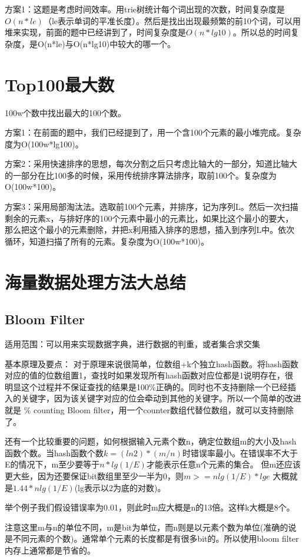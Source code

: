 方案1：这题是考虑时间效率。用trie树统计每个词出现的次数，时间复杂度是$O(n*le)$（le表示单词的平准长度）。然后是找出出现最频繁的前10个词，可以用堆来实现，前面的题中已经讲到了，时间复杂度是$O(n*lg10)$。所以总的时间复杂度，是O(n*le)与O(n*lg10)中较大的哪一个。

\section{Top100最大数}
100w个数中找出最大的100个数。

方案1：在前面的题中，我们已经提到了，用一个含100个元素的最小堆完成。复杂度为O(100w*lg100)。

方案2：采用快速排序的思想，每次分割之后只考虑比轴大的一部分，知道比轴大的一部分在比100多的时候，采用传统排序算法排序，取前100个。复杂度为O(100w*100)。

方案3：采用局部淘汰法。选取前100个元素，并排序，记为序列L。然后一次扫描剩余的元素x，与排好序的100个元素中最小的元素比，如果比这个最小的要大，那么把这个最小的元素删除，并把x利用插入排序的思想，插入到序列L中。依次循环，知道扫描了所有的元素。复杂度为O(100w*100)。

\section{海量数据处理方法大总结}
\subsection{Bloom Filter}
适用范围：可以用来实现数据字典，进行数据的判重，或者集合求交集

基本原理及要点：
对于原理来说很简单，位数组+k个独立hash函数。将hash函数对应的值的位数组置1，查找时如果发现所有hash函数对应位都是1说明存在，很明显这个过程并不保证查找的结果是100\%正确的。同时也不支持删除一个已经插入的关键字，因为该关键字对应的位会牵动到其他的关键字。所以一个简单的改进就是
\% counting Bloom filter，用一个counter数组代替位数组，就可以支持删除了。

还有一个比较重要的问题，如何根据输入元素个数n，确定位数组m的大小及hash函数个数。当hash函数个数$k=(ln2)*(m/n)$时错误率最小。在错误率不大于E的情况下，m至少要等于$n*lg(1/E)$才能表示任意n个元素的集合。
但m还应该更大些，因为还要保证bit数组里至少一半为0，则$m>=nlg(1/E)*lge$
 大概就是$1.44*nlg(1/E)$(lg表示以2为底的对数)。

举个例子我们假设错误率为0.01，则此时m应大概是n的13倍。这样k大概是8个。

注意这里m与n的单位不同，m是bit为单位，而n则是以元素个数为单位(准确的说是不同元素的个数)。通常单个元素的长度都是有很多bit的。所以使用bloom filter内存上通常都是节省的。

